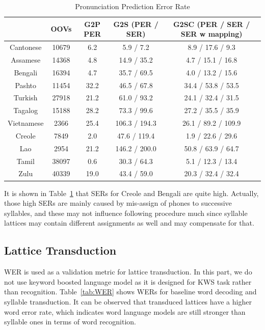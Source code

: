 \documentclass[journal]{IEEEtran}
\begin{document}
\begin{table}[t]
  \caption{Pronunciation Prediction Error Rate}
  \label{tab:g2s}
  \centering
  \begin{tabular}{|c|c|c|c|c|}
    \hline
    & OOVs &  G2P PER & G2S (PER / SER) & G2SC (PER / SER / SER w mapping) \\
    \hline
    Cantonese     & 10679 & 6.2  & 5.9 / 7.2      & 8.9 / 17.6 / 9.3 \\
    Assamese      & 14368 & 4.8  & 14.9 / 35.2    & 4.7 / 15.1 / 16.8 \\
    Bengali       & 16394 & 4.7  & 35.7 / 69.5    & 4.0 / 13.2 / 15.6 \\
    Pashto        & 11454 & 32.2 & 46.5 / 67.8    & 34.4 / 53.8 / 53.5 \\
    Turkish       & 27918 & 21.2 & 61.0 / 93.2    & 24.1 / 32.4 / 31.5 \\
    Tagalog       & 15188 & 28.2 & 73.3 / 99.6    & 27.2 / 35.5 / 35.9 \\
    Vietnamese    & 2366  & 25.4 & 106.3 / 194.3  & 26.1 / 89.2 / 109.9 \\
    Creole        & 7849  & 2.0  & 47.6 / 119.4   & 1.9 / 22.6 / 29.6 \\
    Lao           & 2954  & 21.2 & 146.2 / 200.0  & 50.8 / 63.9 / 64.7 \\
    Tamil         & 38097 & 0.6  & 30.3 / 64.3    & 5.1 / 12.3 / 13.4 \\
    Zulu          & 40339 & 19.0 & 43.4 / 59.0    & 20.3 / 32.4 / 32.4 \\
    \hline
  \end{tabular}
\end{table}

It is shown in Table~\ref{tab:g2s} that SERs for Creole and Bengali are quite high. Actually, those high
SERs are mainly caused by mis-assign of phones to successive syllables, and these may not influence following 
procedure much since syllable lattices may contain different assignments as well and may compensate for that.

\subsection{Lattice Transduction}
WER is used as a validation metric for lattice transduction. In this part, we do not use keyword boosted language 
model as it is designed for KWS task rather than recognition. Table~\ref{tab:WER} shows WERs for baseline word 
decoding and syllable transduction. It can be observed that transduced lattices have a higher word error 
rate, which indicates word language models are still stronger than syllable ones in terms of word recognition.
\end{document}
